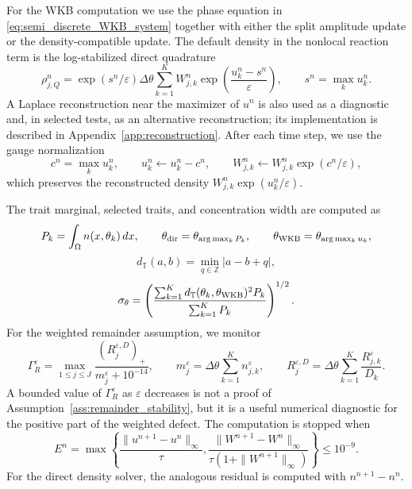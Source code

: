 \documentclass[11pt]{article}
\begin{document}
For the WKB computation we use the phase equation in \eqref{eq:semi_discrete_WKB_system} together with either the split amplitude update or the density-compatible update.  The default density in the nonlocal reaction term is the log-stabilized direct quadrature
\begin{equation}\label{eq:log_stable_rho_new}
    \rho_{j,Q}^n
    =\exp(s^n/\varepsilon)\Delta\theta
    \sum_{k=1}^{K} W_{j,k}^n
    \exp\left(\frac{u_k^n-s^n}{\varepsilon}\right),
    \qquad s^n=\max_k u_k^n.
\end{equation}
A Laplace reconstruction near the maximizer of \(u^n\) is also used as a diagnostic and, in selected tests, as an alternative reconstruction; its implementation is described in Appendix~\ref{app:reconstruction}.  After each time step, we use the gauge normalization
\begin{equation}\label{eq:gauge_new}
    c^n=\max_k u_k^n,
    \qquad
    u_k^n\leftarrow u_k^n-c^n,
    \qquad
    W_{j,k}^n\leftarrow W_{j,k}^n\exp(c^n/\varepsilon),
\end{equation}
which preserves the reconstructed density \(W_{j,k}^n\exp(u_k^n/\varepsilon)\).

The trait marginal, selected traits, and concentration width are computed as
\begin{equation}\label{eq:diagnostics_trait_new}
    P_k=\int_\Omega n(x,\theta_k)\,dx,
    \qquad
    \theta_{\rm dir}=\theta_{\arg\max_k P_k},
    \qquad
    \theta_{\rm WKB}=\theta_{\arg\max_k u_k},
\end{equation}
\begin{equation}\label{eq:periodic_distance_new}
    d_{\mathbb T}(a,b)=\min_{q\in\mathbb Z}|a-b+q|,
\end{equation}
\begin{equation}\label{eq:sigma_theta_new}
    \sigma_\theta=
    \left(
    \frac{\sum_{k=1}^{K}d_{\mathbb T}(\theta_k,\theta_{\rm WKB})^2P_k}
         {\sum_{k=1}^{K}P_k}
    \right)^{1/2}.
\end{equation}
For the weighted remainder assumption, we monitor
\begin{equation}\label{eq:gamma_R_new}
    \Gamma_R^\varepsilon
    =
    \max_{1\le j\le J}
    \frac{(R_j^{\varepsilon,D})_+}{m_j^\varepsilon+10^{-14}},
    \qquad
    m_j^\varepsilon=\Delta\theta\sum_{k=1}^{K}n_{j,k}^\varepsilon,
    \qquad
    R_j^{\varepsilon,D}=\Delta\theta\sum_{k=1}^{K}\frac{R_{j,k}^\varepsilon}{D_k}.
\end{equation}
A bounded value of \(\Gamma_R^\varepsilon\) as \(\varepsilon\) decreases is not a proof of Assumption~\ref{ass:remainder_stability}, but it is a useful numerical diagnostic for the positive part of the weighted defect.  The computation is stopped when
\begin{equation}\label{eq:stationary_residual_new}
    E^n=
    \max\left\{
    \frac{\|u^{n+1}-u^n\|_\infty}{\tau},
    \frac{\|W^{n+1}-W^n\|_\infty}{\tau(1+\|W^{n+1}\|_\infty)}
    \right\}
    \le 10^{-9}.
\end{equation}
For the direct density solver, the analogous residual is computed with \(n^{n+1}-n^n\).
\end{document}
